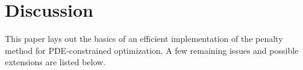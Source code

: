 \documentclass{iopart}
\begin{document}
\section{Discussion}
\label{discussion}
This paper lays out the basics of an efficient implementation of the
penalty method for PDE-constrained optimization. A few remaining issues
and possible extensions are listed below.
\end{document}
